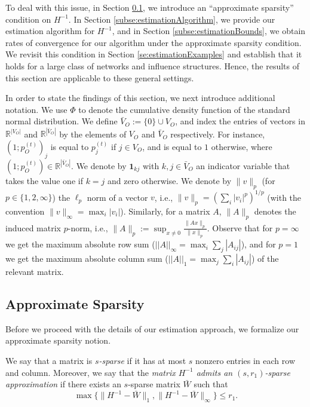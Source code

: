 \documentclass[opre,nonblindrev]{informs3} %
\begin{document}
To deal with this issue,
in Section \ref{subse:approximateSparsity},
we introduce an ``approximate sparsity'' condition on $H^{-1}$.
In Section \ref{subse:estimationAlgorithm},
 we provide our estimation algorithm for $H^{-1}$, and 
in Section  \ref{subse:estimationBounds},
we   obtain rates of convergence 
for our algorithm
under the approximate sparsity condition.
We revisit this condition in Section \ref{se:estimationExamples} and establish that it  holds for a large class of networks and influence structures. Hence, the results of this section are applicable to these general settings.



In order to state the findings of this section, we next introduce additional notation.
We use
$\Phi$ to denote the cumulative density function of the standard normal distribution.
We define $\bar{V}_O := \{0\} \cup V_O$,
and index the entries of vectors in $\mathbb{R}^{|V_O|}$ and
$\mathbb{R}^{|\bar{V}_O|}$ by the elements of $V_O$ and $\bar{V}_O$ respectively.
For instance, $(1;p_O^{(t)})_j$ is equal to
$p_j^{(t)}$ if $j\in V_O$, and is equal to $1$ otherwise, where $(1;p_O^{(t)}) \in \mathbb{R}^{|\bar{V}_O|}$. We denote by $\mathbf{1}_{kj}$
with $k,j\in \bar{V}_O$ an indicator variable that takes the value one if $k=j$ and zero otherwise.
We
denote by $\| {v}\|_p$ (for $p\in \{1,2,\infty\}$)
	the
	$\ell_p$ norm of a vector $ v$, i.e.,
	$\| {v}\|_p = (\sum_i |v_i|^p)^{1/p}$ (with the convention $\| { v}\|_\infty= \max_i |v_i|$).
	Similarly, for a matrix $A$, $\| A \|_p$ denotes the induced matrix $p$-norm, i.e.,    $\| A \|_p := \sup_{{x}\neq 0} \frac{\|A{x}\|_p}{\|{x}\|_p}$.
	Observe that for $p=\infty$ we get 
	the maximum absolute row sum 
	($||A||_\infty = \max_i \sum_{j} |A_{ij}|$), and for $p=1$ we get
	the maximum absolute  column sum
	($||A||_1 = \max_j \sum_i |A_{ij}|$) of the relevant matrix.



\subsection{Approximate Sparsity} \label{subse:approximateSparsity}
Before we proceed with the details of our estimation approach, we formalize our approximate sparsity notion.
\begin{definition} \label{def:appxSparse}
	We say that a matrix is \emph{$s$-sparse} if it has at most $s$ nonzero entries in each row and column.
Moreover, 	
	we say that the
\emph{matrix
	$H^{-1}$
	admits
	 an 
	 $(s, r_1)$-sparse approximation} if
	there exists an $s$-sparse
	 matrix $\bar{W}$
	 such that
	 \[
	 \max{\bigg \{ }
	 \| H^{-1}-\bar{W} \|_1,\| H^{-1}-\bar{W} \|_\infty
	 {\bigg \} }
	  \leq r_{1}.
	  \]

\end{definition}
\end{document}
